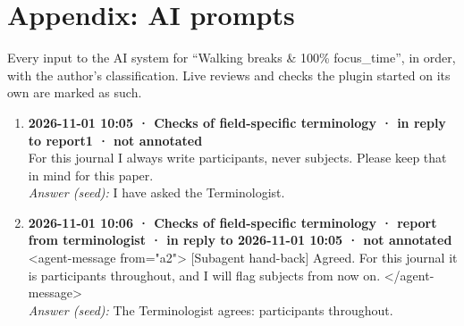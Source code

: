 \section*{Appendix: AI prompts}

Every input to the AI system for “Walking breaks \& 100\% focus\_time”, in order, with the author's classification. Live reviews and checks the plugin started on its own are marked as such.

\begin{enumerate}
  \item \textbf{2026-11-01 10:05 · Checks of field-specific terminology · in reply to report1 · not annotated} \\
  For this journal I always write participants, never subjects. Please keep that in mind for this paper.
  \\ \textit{Answer (seed):} I have asked the Terminologist.
  \item \textbf{2026-11-01 10:06 · Checks of field-specific terminology · report from terminologist · in reply to 2026-11-01 10:05 · not annotated} \\
  <agent-message from="a2"> [Subagent hand-back] Agreed. For this journal it is participants throughout, and I will flag subjects from now on. </agent-message>
  \\ \textit{Answer (seed):} The Terminologist agrees: participants throughout.
\end{enumerate}
